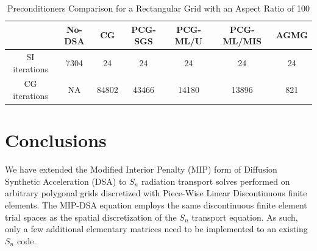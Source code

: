 \documentclass[preprint,10pt]{elsarticle}
\renewcommand{\(}{\left(}
\renewcommand{\)}{\right)}
\renewcommand{\[}{\left[}
\renewcommand{\]}{\right]}
\newcommand{\sn}{\ensuremath{S_n}\xspace}
\begin{document}
\begin{table}[!htbp]
  \caption{Preconditioners Comparison for a Rectangular Grid with an Aspect Ratio of 100}
  \begin{center}
    \begin{tabular}{|c|c|c|c|c|c|c|}
      \hline
       & No-DSA & CG & PCG-SGS & PCG-ML/U & PCG-ML/MIS & AGMG \\
      \hline
      SI iterations & 7304    & 24      & 24        & 24       & 24      & 24 \\
      CG iterations & NA      & 84802   & 43466     & 14180    & 13896   & 821 \\
      \hline
    \end{tabular}
    \label{table_ar_100}
  \end{center}
\end{table}                  

\section{Conclusions} \label{sec_conc}
We have extended the Modified Interior Penalty (MIP) form of Diffusion Synthetic Acceleration (DSA) 
to \sn radiation transport solves performed on arbitrary polygonal grids discretized 
with Piece-Wise Linear Discontinuous finite elements. 
The MIP-DSA equation employs the same discontinuous finite element trial spaces as 
the spatial discretization of the \sn transport equation. As such, 
only a few additional elementary matrices need to be implemented to an existing \sn code. 
%
%
%
\end{document}
